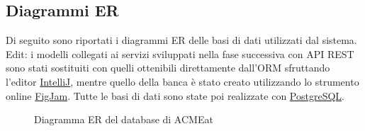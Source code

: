 \documentclass[11pt]{article} %
\begin{document}
\subsection{Diagrammi ER}

Di seguito sono riportati i diagrammi ER delle basi di dati utilizzati dal sistema.\\
Edit: i modelli collegati ai servizi sviluppati nella fase successiva con API REST sono stati sostituiti con quelli ottenibili direttamente dall'ORM sfruttando l'editor \href{https://www.jetbrains.com/idea/}{IntelliJ}, mentre quello della banca è stato creato utilizzando lo strumento online \href{https://www.figma.com/figjam/}{FigJam}. Tutte le basi di dati sono state poi realizzate con \href{https://www.postgresql.org/}{PostgreSQL}.

\begin{figure}[H]
\begin{center}
\caption{Diagramma ER del database di ACMEat}
\label{db:acmeat}
\end{center}
\end{figure}
\end{document}

